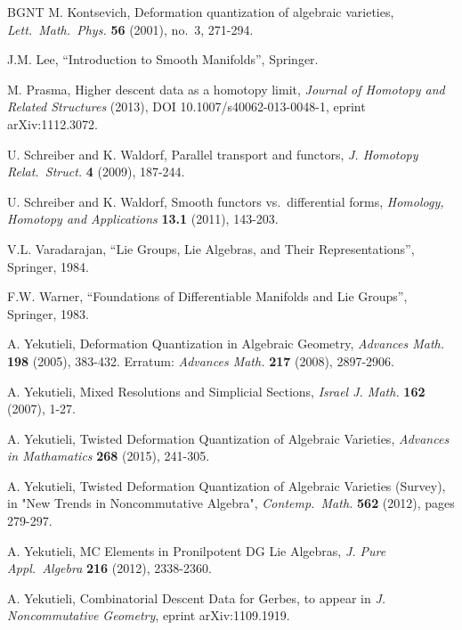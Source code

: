 \documentclass[10pt, a4paper]{amsart}
\theoremstyle{definition}
\numberwithin{equation}{section}
\begin{document}
\begin{thebibliography}{BGNT}
 M. Kontsevich,
    Deformation quantization of algebraic varieties,
    {\em Lett.\ Math.\ Phys.} {\bf 56} (2001), no.\ 3, 271-294.

 J.M. Lee, 
``Introduction to Smooth Manifolds'', Springer. 

 M. Prasma,
Higher descent data as a homotopy limit,
{\em Journal of Homotopy and Related Structures} (2013), 
DOI 10.1007/s40062-013-0048-1, eprint arXiv:1112.3072.

 U. Schreiber and K. Waldorf, 
Parallel transport and functors, 
{\em J. Homotopy Relat.\ Struct.} {\bf 4} (2009), 187-244.

 U. Schreiber and K. Waldorf, 
Smooth functors vs.\ differential forms, 
{\em Homology, Homotopy and Applications} {\bf 13.1} (2011), 143-203.

 V.L. Varadarajan,
  ``Lie Groups, Lie Algebras, and Their Representations'',
  Springer, 1984.

 F.W. Warner, 
  ``Foundations of Differentiable Manifolds and Lie Groups'',
  Springer, 1983. 

 A. Yekutieli,
	Deformation Quantization in Algebraic Geometry,
	{\em Advances Math.} {\bf 198} (2005), 383-432.
	Erratum: {\em Advances Math.} {\bf 217} (2008), 2897-2906.

 A. Yekutieli, 
Mixed Resolutions and Simplicial Sections, 
{\em Israel J. Math.} {\bf 162} (2007), 1-27.

 A. Yekutieli,
Twisted Deformation Quantization of Algebraic Varieties,
{\em Advances in Mathamatics} {\bf 268} (2015),  241-305.

 A. Yekutieli,
Twisted Deformation Quantization of Algebraic Varieties (Survey),
in "New Trends in Noncommutative Algebra", {\em Contemp.\ Math.} {\bf 562}
(2012), pages 279-297.

 A. Yekutieli,
MC Elements in Pronilpotent DG Lie Algebras,
{\em J. Pure Appl.\ Algebra} {\bf 216} (2012), 2338-2360.

 A. Yekutieli,
Combinatorial Descent Data for Gerbes,
to appear in {\em J. Noncommutative Geometry}, eprint arXiv:1109.1919.
\end{thebibliography}


\cleardoublepage                              
\printindex
\end{document}
